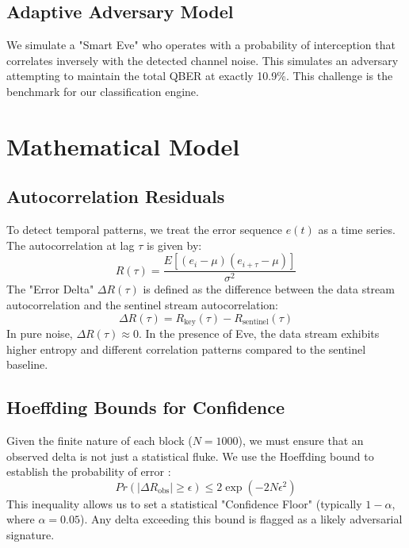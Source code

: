 \documentclass[journal,onecolumn,12pt,draftclsnofoot]{IEEEtran}
\begin{document}
\subsection{Adaptive Adversary Model}
We simulate a "Smart Eve" who operates with a probability of interception that correlates inversely with the detected channel noise. This simulates an adversary attempting to maintain the total QBER at exactly 10.9\%. This challenge is the benchmark for our classification engine.

\newpage

\section{Mathematical Model}

\subsection{Autocorrelation Residuals}
To detect temporal patterns, we treat the error sequence $e(t)$ as a time series. The autocorrelation at lag $\tau$ is given by:
\begin{equation}
    R(\tau) = \frac{E[(e_i - \mu)(e_{i+\tau} - \mu)]}{\sigma^2}
\end{equation}
The "Error Delta" $\Delta R(\tau)$ is defined as the difference between the data stream autocorrelation and the sentinel stream autocorrelation:
\begin{equation}
    \Delta R(\tau) = R_{\text{key}}(\tau) - R_{\text{sentinel}}(\tau)
\end{equation}
In pure noise, $\Delta R(\tau) \approx 0$. In the presence of Eve, the data stream exhibits higher entropy and different correlation patterns compared to the sentinel baseline.

\subsection{Hoeffding Bounds for Confidence}
Given the finite nature of each block ($N=1000$), we must ensure that an observed delta is not just a statistical fluke. We use the Hoeffding bound to establish the probability of error \cite{hoeffding}:
\begin{equation}
    Pr(|\Delta R_{\text{obs}}| \ge \epsilon) \le 2 \exp(-2N\epsilon^2)
\end{equation}
This inequality allows us to set a statistical "Confidence Floor" (typically $1-\alpha$, where $\alpha=0.05$). Any delta exceeding this bound is flagged as a likely adversarial signature.
\end{document}
